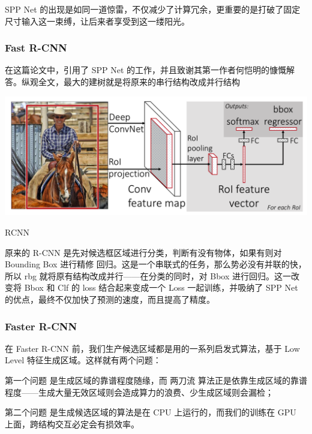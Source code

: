 SPP Net 的出现是如同一道惊雷，不仅减少了计算冗余，更重要的是打破了固定尺寸输入这一束缚，让后来者享受到这一缕阳光。

\subsubsection{Fast R-CNN}
在这篇论文中，引用了 SPP Net 的工作，并且致谢其第一作者何恺明的慷慨解答。纵观全文，最大的建树就是将原来的串行结构改成并行结构
\begin{uscfigure}
	\includegraphics[width=\textwidth]{./Pictures/fast_rcnn.png}	
	\caption{RCNN}	
\end{uscfigure}
原来的 R-CNN 是先对候选框区域进行分类，判断有没有物体，如果有则对 Bounding Box 进行精修 回归。这是一个串联式的任务，那么势必没有并联的快，所以 rbg 就将原有结构改成并行——在分类的同时，对 Bbox 进行回归。这一改变将 Bbox 和 Clf 的 loss 结合起来变成一个 Loss 一起训练，并吸纳了 SPP Net 的优点，最终不仅加快了预测的速度，而且提高了精度。
\subsubsection{Faster R-CNN}
在 Faster R-CNN 前，我们生产候选区域都是用的一系列启发式算法，基于 Low Level 特征生成区域。这样就有两个问题：

第一个问题 是生成区域的靠谱程度随缘，而 两刀流 算法正是依靠生成区域的靠谱程度——生成大量无效区域则会造成算力的浪费、少生成区域则会漏检；

第二个问题 是生成候选区域的算法是在 CPU 上运行的，而我们的训练在 GPU 上面，跨结构交互必定会有损效率。

